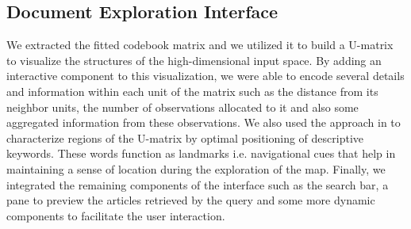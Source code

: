 \documentclass[a4paper]{article}
\begin{document}
\subsection*{Document Exploration Interface}
We extracted the fitted codebook matrix and we utilized it to build a U-matrix \citep{ultsch1993} to visualize the structures of the high-dimensional input space. By adding an interactive component to this visualization, we were able to encode several details and information within each unit of the matrix such as the distance from its neighbor units, the number of observations allocated to it and also some aggregated information from these observations. We also used the approach in \citet{lagus1999} to characterize regions of the U-matrix by optimal positioning of descriptive keywords. These words function as landmarks i.e. navigational cues that help in maintaining a sense of location during the exploration of the map. Finally, we integrated the remaining components of the interface such as the search bar, a pane to preview the articles retrieved by the query and some more dynamic components to facilitate the user interaction.



\end{document}
